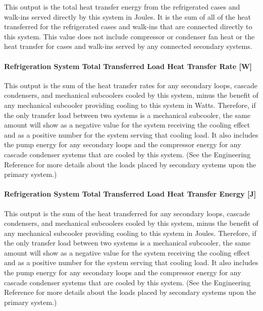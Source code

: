 This output is the total heat transfer energy from the refrigerated cases and walk-ins served directly by this system in Joules. It is the sum of all of the heat transferred for the refrigerated cases and walk-ins that are connected directly to this system. This value does not include compressor or condenser fan heat or the heat transfer for cases and walk-ins served by any connected secondary systems.

\paragraph{Refrigeration System Total Transferred Load Heat Transfer Rate {[}W{]}}\label{refrigeration-system-total-transferred-load-heat-transfer-rate-w}

This output is the sum of the heat transfer rates for any secondary loops, cascade condensers, and mechanical subcoolers cooled by this system, minus the benefit of any mechanical subcooler providing cooling to this system in Watts. Therefore, if the only transfer load between two systems is a mechanical subcooler, the same amount will show as a negative value for the system receiving the cooling effect and as a positive number for the system serving that cooling load. It also includes the pump energy for any secondary loops and the compressor energy for any cascade condenser systems that are cooled by this system. (See the Engineering Reference for more details about the loads placed by secondary systems upon the primary system.)

\paragraph{Refrigeration System Total Transferred Load Heat Transfer Energy {[}J{]}}\label{refrigeration-system-total-transferred-load-heat-transfer-energy-j}

This output is the sum of the heat transferred for any secondary loops, cascade condensers, and mechanical subcoolers cooled by this system, minus the benefit of any mechanical subcooler providing cooling to this system in Joules. Therefore, if the only transfer load between two systems is a mechanical subcooler, the same amount will show as a negative value for the system receiving the cooling effect and as a positive number for the system serving that cooling load. It also includes the pump energy for any secondary loops and the compressor energy for any cascade condenser systems that are cooled by this system. (See the Engineering Reference for more details about the loads placed by secondary systems upon the primary system.)


